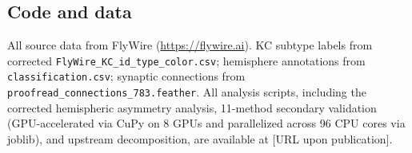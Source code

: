 \documentclass[10pt]{article}
\begin{document}
\subsection*{Code and data}
All source data from FlyWire (\url{https://flywire.ai}). KC subtype labels from corrected \texttt{FlyWire\_KC\_id\_type\_color.csv}; hemisphere annotations from \texttt{classification.csv}; synaptic connections from \texttt{proofread\_connections\_783.feather}. All analysis scripts, including the corrected hemispheric asymmetry analysis, 11-method secondary validation (GPU-accelerated via CuPy on 8 GPUs and parallelized across 96 CPU cores via joblib), and upstream decomposition, are available at [URL upon publication].



\end{document}
